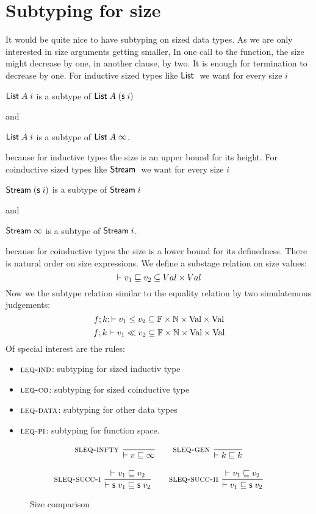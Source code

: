 \section{Subtyping for size}
It would be quite nice to have subtyping on sized data types.
As we are only interested in size arguments getting smaller, 
In one call to the function, the size might decrease by one, in another clause, by two.
It is enough for termination to decrease by one.
For inductive sized types like $\mathsf{List}\;$ we want for every size $i$
\begin{bsp}
$\mathsf{List}\; A\; i$ is a subtype of $\mathsf{List}\; A \; (\mathsf{s}\; i)$
\end{bsp}
and
\begin{bsp}
$\mathsf{List}\; A\; i$ is a subtype of $\mathsf{List}\; A \; \infty$.
\end{bsp}
because for inductive types the size is an upper bound for its height.
For coinductive sized types like $\mathsf{Stream}\;$ we want for every size $i$
\begin{bsp}
$\mathsf{Stream}\; (\mathsf{s}\; i) $ is a subtype of $\mathsf{Stream}\; i$
\end{bsp}
and
\begin{bsp}
$\mathsf{Stream}\; \infty$ is a subtype of $\mathsf{Stream}\; i$.
\end{bsp}
because for coinductive types the size is a lower bound for its definedness.
There is natural order on size expressions.
We define a substage relation on size values:
\[\vdash v_1\sqsubseteq v_2 \subseteq Val \times Val \]
Now we the subtype relation similar to the equality relation by two simulatemous judgements:
\[f;k;\vdash v_1\leq v_2 \subseteq \mathbb{F} \times \mathbb{N} \times \mathrm{Val} \times \mathrm{Val} \]
\[f;k\vdash v_1{\;\ll\;}v_2 \subseteq \mathbb{F} \times \mathbb{N} \times\mathrm{Val} \times \mathrm{Val} \]
Of special interest are the rules:
\begin{itemize}
\item
$\mbox{\sc leq-ind}$: subtyping for sized inductiv type 
\item
$\mbox{\sc leq-co}$: subtyping for sized coinductive type
\item
$\mbox{\sc leq-data}$: subtyping for other data types
\item
$\mbox{\sc leq-pi}$: subtyping for function space. 
\end{itemize}
\begin{figure}
\begin{gather*}
\mbox{\sc sleq-infty}\ \dfrac{}{\vdash v\sqsubseteq\infty}
\qquad
\mbox{\sc sleq-gen}\ \dfrac{}{\vdash k\sqsubseteq k}
\\[2ex]
\mbox{\sc sleq-succ-i}\ \dfrac{\vdash v_1\sqsubseteq v_2}{\vdash\mathsf{s}\; v_1\sqsubseteq\mathsf{s}\; v_2}
\qquad
\mbox{\sc sleq-succ-ii}\ \dfrac{\vdash v_1\sqsubseteq v_2}{\vdash v_1\sqsubseteq\mathsf{s}\; v_2}
\end{gather*}
\caption{Size comparison}
\end{figure}

